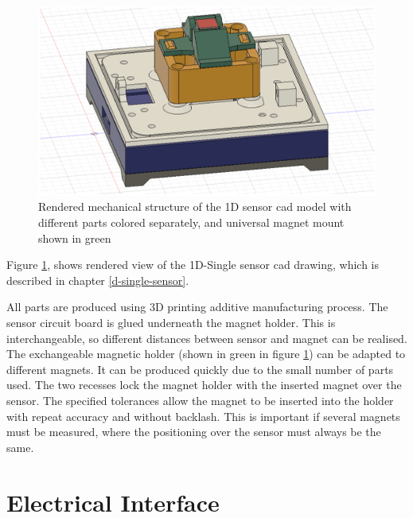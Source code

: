 \begin{figure}
\centering
\includegraphics{./generated_images/border_Rendered_mechanical_structure_of_the_1D_sensor_(+cad)_model_with_different_parts_colored_separately,_and_universal_magnet_mount_shown_in_green.png}
\caption{Rendered mechanical structure of the 1D sensor \gls{cad} model
with different parts colored separately, and universal magnet mount
shown in green
\label{Rendered_mechanical_structure_of_the_1D_sensor_(+cad)_model_with_different_parts_colored_separately,_and_universal_magnet_mount_shown_in_green.png}}
\end{figure}

Figure
\ref{Rendered_mechanical_structure_of_the_1D_sensor_(+cad)_model_with_different_parts_colored_separately,_and_universal_magnet_mount_shown_in_green.png},
shows rendered view of the 1D-Single sensor \gls{cad} drawing, which is
described in chapter \ref{d-single-sensor}.

All parts are produced using 3D printing additive manufacturing process.
The sensor circuit board is glued underneath the magnet holder. This is
interchangeable, so different distances between sensor and magnet can be
realised. The exchangeable magnetic holder (shown in green in figure
\ref{Rendered_mechanical_structure_of_the_1D_sensor_(+cad)_model_with_different_parts_colored_separately,_and_universal_magnet_mount_shown_in_green.png})
can be adapted to different magnets. It can be produced quickly due to
the small number of parts used. The two recesses lock the magnet holder
with the inserted magnet over the sensor. The specified tolerances allow
the magnet to be inserted into the holder with repeat accuracy and
without backlash. This is important if several magnets must be measured,
where the positioning over the sensor must always be the same.

\hypertarget{electrical-interface}{%
\section{Electrical Interface}\label{electrical-interface}}

